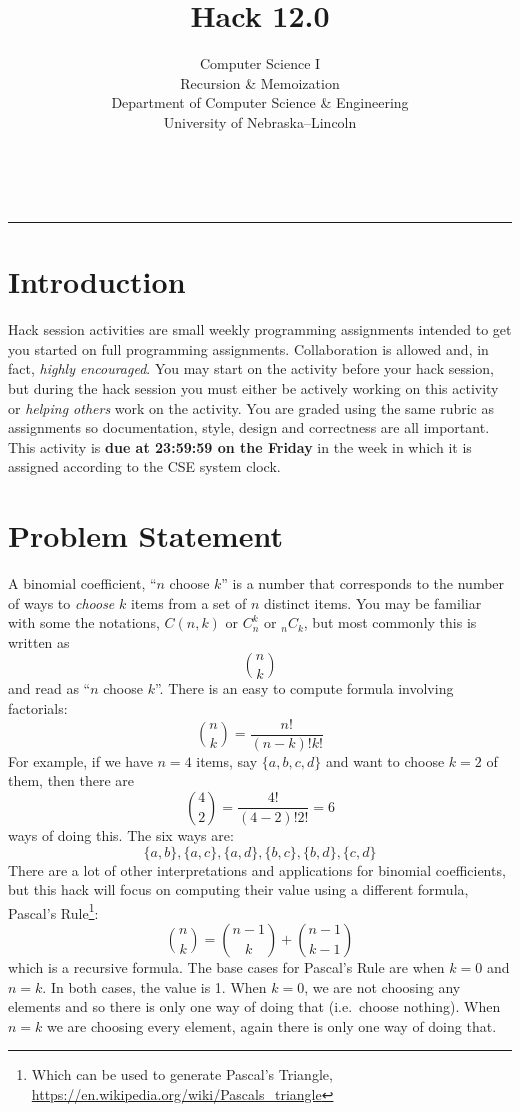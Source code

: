 \documentclass[12pt]{scrartcl}
\title{Hack 12.0}\let\Title\@title
\subtitle{Computer Science I\\
Recursion \& Memoization\\
{\small
\vskip1cm
Department of Computer Science \& Engineering \\
University of Nebraska--Lincoln}
\vskip-3cm}
\date{~}
\begin{document}
\maketitle

\hrule

\section*{Introduction}

Hack session activities are small weekly programming assignments intended
to get you started on full programming assignments.  Collaboration is allowed
and, in fact, \emph{highly encouraged}.  You may start on the activity before
your hack session, but during the hack session you must either be actively 
working on this activity or \emph{helping others} work on the activity.
You are graded using the same rubric as assignments so documentation, style, 
design and correctness are all important.  This activity is \textbf{due 
at 23:59:59 on the Friday} in the week in which it is assigned according 
to the CSE system clock.

\section*{Problem Statement}

A binomial coefficient, ``$n$ choose $k$'' is a number that corresponds 
to the number of ways to \emph{choose} $k$ items from a set of $n$ distinct
items.  You may be familiar with some the notations, $C(n,k)$ or $C_n^k$ 
or ${}_{n}C_k $, but most commonly this is written as 
  $${n \choose k}$$
and read as ``$n$ choose $k$''.  There is an easy to compute formula involving
factorials:
  $${n \choose k} = \frac{n!}{(n-k)!k!}$$
For example, if we have $n = 4$ items, say $\{a, b, c, d\}$ and want to choose
$k=2$ of them, then there are 
  $${4 \choose 2} = \frac{4!}{(4-2)!2!} = 6$$
ways of doing this.  The six ways are:
  $$\{a, b\}, \{a, c\}, \{a, d\}, \{b, c\}, \{b, d\}, \{c, d\}$$
There are a lot of other interpretations and applications for binomial 
coefficients, but this hack will focus on computing their value using
a different formula, Pascal's Rule\footnote{Which can be used to generate
Pascal's Triangle, \url{https://en.wikipedia.org/wiki/Pascals_triangle}}:
  $${n \choose k} = {n-1 \choose k} + {n-1 \choose k-1}$$
which is a recursive formula.  The base cases for Pascal's Rule are when
$k = 0$ and $n = k$.  In both cases, the value is 1.  When $k = 0$, we are
not choosing any elements and so there is only one way of doing that (i.e.\
choose nothing).  When $n = k$ we are choosing every element, again there
is only one way of doing that.  
\end{document}
